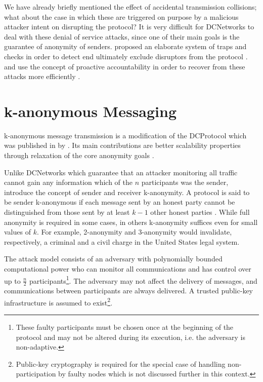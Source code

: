 We have already briefly mentioned the effect of accidental transmission collisions; what about the
case in which these are triggered on purpose by a malicious attacker intent on disrupting the
protocol? It is very difficult for \acp{DCNetwork} to deal with these denial of service attacks,
since one of their main goals is the guarantee of anonymity of senders. \citeauthor{journals/joc/Chaum88}
proposed an elaborate system of traps and checks in order to detect end ultimately exclude
disruptors from the protocol \cite{journals/joc/Chaum88}. \Dissent and \Verdict use the concept of
proactive accountability in order to recover from these attacks more efficiently \cite{journals/corr/abs-1004-3057,corrigan2013proactively}.

\section{k-anonymous Messaging}


k-anonymous message transmission is a modification of the \ac{DCProtocol} which was published in \citeyear{von2003k} by \citeauthor{von2003k}. Its main contributions are better scalability properties through relaxation
of the core anonymity goals \cite{von2003k}.

Unlike \acp{DCNetwork} which guarantee that an attacker monitoring all traffic cannot gain
any information which of the $n$ participants was the sender, \citeauthor{von2003k} introduce
the concept of sender and receiver k-anonymity. A protocol is said to be sender k-anonymous
if each message sent by an honest party cannot be distinguished from those sent by at least $k - 1$
other honest parties \cite{von2003k}. While full anonymity is required in some cases, in others
k-anonymity suffices even for small values of $k$. For example, 2-anonymity and 3-anonymity would invalidate, respectively, a criminal and a civil charge in the United States legal system.

The attack model consists of an adversary with polynomially bounded computational power
who can monitor all communications and
has control over up to $\frac{n}{2}$ participants\footnote{
These faulty participants must be chosen once at the beginning of the protocol and may not
be altered during its execution, i.e. the adversary is non-adaptive.}. The adversary may not affect
the delivery of messages, and communications between participants are always delivered.
A trusted public-key infrastructure is assumed to exist\footnote{Public-key cryptography is
required for the special case of handling non-participation by faulty nodes which is not discussed further
in this context.}.

